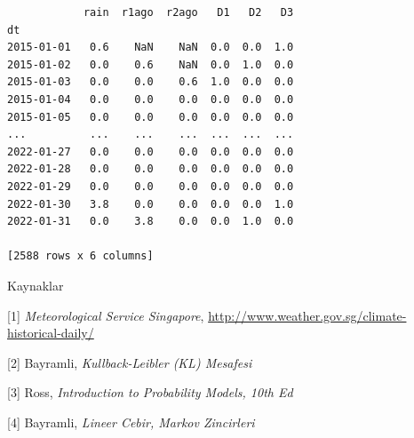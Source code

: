 \documentclass[12pt,fleqn]{article}\usepackage{../../common}
\begin{document}
\begin{verbatim}
            rain  r1ago  r2ago   D1   D2   D3
dt                                           
2015-01-01   0.6    NaN    NaN  0.0  0.0  1.0
2015-01-02   0.0    0.6    NaN  0.0  1.0  0.0
2015-01-03   0.0    0.0    0.6  1.0  0.0  0.0
2015-01-04   0.0    0.0    0.0  0.0  0.0  0.0
2015-01-05   0.0    0.0    0.0  0.0  0.0  0.0
...          ...    ...    ...  ...  ...  ...
2022-01-27   0.0    0.0    0.0  0.0  0.0  0.0
2022-01-28   0.0    0.0    0.0  0.0  0.0  0.0
2022-01-29   0.0    0.0    0.0  0.0  0.0  0.0
2022-01-30   3.8    0.0    0.0  0.0  0.0  1.0
2022-01-31   0.0    3.8    0.0  0.0  1.0  0.0

[2588 rows x 6 columns]
\end{verbatim}



Kaynaklar

[1] {\em Meteorological Service Singapore},
    \url{http://www.weather.gov.sg/climate-historical-daily/}

[2] Bayramli, {\em Kullback-Leibler (KL) Mesafesi}

[3] Ross, {\em Introduction to Probability Models, 10th Ed}

[4] Bayramli, {\em Lineer Cebir, Markov Zincirleri}
\end{document}
